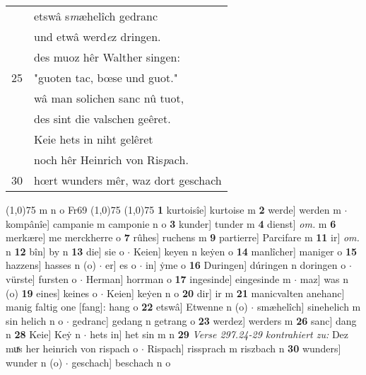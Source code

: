 \documentclass[8pt,a4paper,notitlepage]{article}
\begin{document}
\begin{table}[ht]
\begin{minipage}[t]{0.5\linewidth}
\begin{tabular}{rl}
 & etswâ s\textit{m}æhelîch gedranc\\ 
 & und etwâ werd\textit{e}z dringen.\\ 
 & des muoz hêr Walther singen:\\ 
25 & "guoten tac, bœse und guot."\\ 
 & wâ man solichen sanc nû tuot,\\ 
 & des sint die valschen geêret.\\ 
 & Keie hets in niht gelêret\\ 
 & noch hêr Heinrich von Ris\textit{p}ach.\\ 
30 & hœrt wunders mêr, waz dort geschach\\ 
\end{tabular}
\scriptsize
\line(1,0){75} \newline
m n o Fr69 \newline
\line(1,0){75} \newline
\newline
\line(1,0){75} \newline
\textbf{1} kurtoisîe] kurtoise m \textbf{2} werde] werden m  $\cdot$ kompânîe] campanie m camponie n o \textbf{3} kunder] tunder m \textbf{4} dienst] \textit{om.} m \textbf{6} merkære] me merckherre o \textbf{7} rûhes] ruchens m \textbf{9} partierre] Parcifare m \textbf{11} ir] \textit{om.} n \textbf{12} bîn] by n \textbf{13} die] sie o  $\cdot$ Keien] keyen n keẏen o \textbf{14} manlîcher] maniger o \textbf{15} hazzens] hasses n (o)  $\cdot$ er] es o  $\cdot$ in] ẏme o \textbf{16} Duringen] dúringen n doringen o  $\cdot$ vürste] fursten o  $\cdot$ Herman] horrman o \textbf{17} ingesinde] eingesinde m  $\cdot$ maz] was n (o) \textbf{19} eines] keines o  $\cdot$ Keien] keẏen n o \textbf{20} dir] ir m \textbf{21} manicvalten anehanc] manig faltig one [fang]: hang o \textbf{22} etswâ] Etwenne n (o)  $\cdot$ smæhelîch] sinehelich m sin helich n o  $\cdot$ gedranc] gedang n getrang o \textbf{23} werdez] werders m \textbf{26} sanc] dang n \textbf{28} Keie] Keẏ n  $\cdot$ hets in] het sin m n \textbf{29} \textit{Verse 297.24-29 kontrahiert zu:} Dez muͯs her heinrich von rispach o   $\cdot$ Rispach] rissprach m riszbach n \textbf{30} wunders] wunder n (o)  $\cdot$ geschach] beschach n o \newline
\end{minipage}
\end{table}
\newpage
\end{document}
